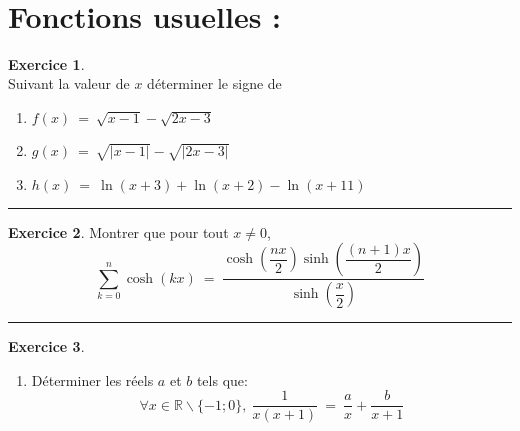 \documentclass[10pt,a4paper]{article}
\newcommand{\R}{\mathbb{R}}
\theoremstyle{definition}
\theoremstyle{definition}
\newtheorem{exo}{Exercice}
\begin{document}
\quad\\
\section*{Fonctions usuelles :}

\begin{center}
\begin{minipage}[t]{0.45\linewidth}
\raggedright
\begin{exo}\quad\\
Suivant la valeur de $x$ déterminer le signe de
\begin{enumerate}
\item $ f(x) \ = \ \sqrt{x-1} - \sqrt{2x-3}$
\item $ g(x) \ = \ \sqrt{|x-1|} - \sqrt{|2x-3|}$
\item $ h(x) \ = \ \ln(x+3) + \ln(x+2) - \ln(x+11)$
\end{enumerate}
\end{exo}
\begin{center}
\rule{1\linewidth}{0.6pt}
\end{center}
\begin{exo}
Montrer que pour tout $x\neq 0$,
$$\sum\limits_{k=0}^{n} \cosh(kx) \ = \ \dfrac{\cosh\left(\dfrac{nx}{2}\right)\sinh\left(\dfrac{(n+1)x}{2}\right)}{\sinh\left(\dfrac{x}{2}\right)}$$
\end{exo}
\begin{center}
\rule{1\linewidth}{0.6pt}
\end{center}

\begin{exo}\quad\\ 
\begin{enumerate}
\item Déterminer les réels $a$ et $b$ tels que:
$$\forall x \in\R \backslash \{-1;0\}, ~\dfrac{1}{x(x+1)} \ = \ \dfrac{a}{x} + \dfrac{b}{x+1}$$
\end{enumerate}
\end{exo}


\end{minipage}
\end{center}
\end{document}
